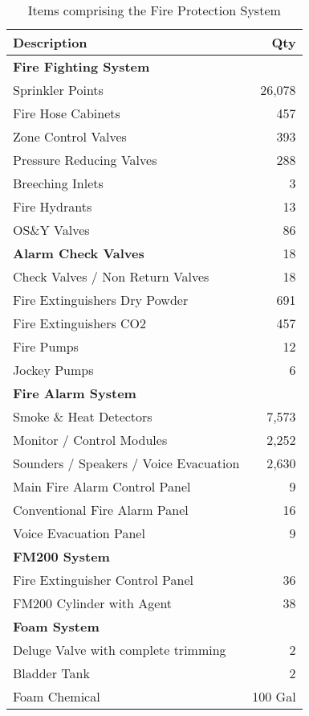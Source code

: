 \begin{table}[htbp]
\begin{tabular}{lr}
\toprule
\textbf{Description}	 &\textbf{Qty}\\
\midrule 	 
\textbf{Fire Fighting System}	 &\\
Sprinkler Points	    &26,078\\
Fire Hose Cabinets	    &457 \\
Zone Control Valves	    &393 \\
Pressure Reducing Valves	 &288 \\
Breeching Inlets	        &3\\ 
Fire Hydrants	            &13\\ 
OS\&Y Valves	               &86\\ 
\textbf{Alarm Check Valves}	              &18 \\
Check Valves / Non Return Valves &18 \\
Fire Extinguishers Dry Powder	 &691 \\
Fire Extinguishers CO2	           &457 \\
Fire Pumps	                     &12 \\
Jockey Pumps	                     &6 \\
\midrule 	 
\textbf{Fire Alarm System}	 &\\
Smoke \& Heat Detectors	 &7,573 \\
Monitor / Control Modules	       &2,252 \\
Sounders / Speakers / Voice Evacuation	   &2,630 \\
Main Fire Alarm Control Panel	         &9 \\
Conventional Fire Alarm Panel	        &16 \\
Voice Evacuation Panel	                  &9 \\
\midrule 
\textbf{FM200 System}	 &\\
Fire Extinguisher Control Panel	&36 \\
FM200 Cylinder with Agent	            &38 \\
\midrule 	 
\textbf{Foam System}	 &\\
Deluge Valve with complete trimming	 &2 \\
Bladder Tank	                        &2 \\
Foam Chemical	                   &100 Gal\\
\bottomrule
\end{tabular}
\caption{Items comprising the Fire Protection System}
\label{fireitems}
\end{table}


